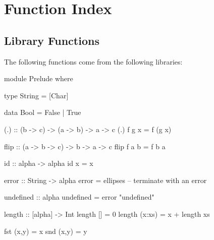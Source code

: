 
\chapter{Function Index}




\printindex


\section{Library Functions}

\begin{comment}
\begin{code}
import Prelude(Char)
ellipses = undefined
\end{code}
\end{comment}


The following functions come from the following libraries:

\begin{code}
module Prelude where

type String = [Char]

data Bool = False | True

(.) :: (b -> c) -> (a -> b) -> a -> c
(.) f g x = f (g x)

flip :: (a -> b -> c) -> b -> a -> c
flip f a b = f b a

id :: alpha -> alpha
id x = x

error :: String -> alpha
error = ellipses -- terminate with an error

undefined :: alpha
undefined = error "undefined"

length :: [alpha] -> Int
length []      = 0
length (x:xs)  = x + length xs

fst (x,y) = x
snd (x,y) = y
\end{code}

